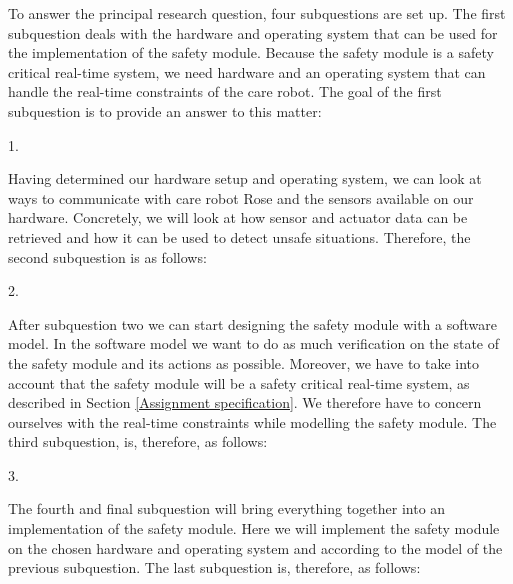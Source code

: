 \documentclass[12pt]{scrreprt}
\begin{document}
To answer the principal research question, four subquestions are set up. The first subquestion deals with the hardware and operating system that can be used for the implementation of the safety module. Because the safety module is a safety critical real-time system, we need hardware and an operating system that can handle the real-time constraints of the care robot. The goal of the first subquestion is to provide an answer to this matter:

\begin{flushleft}
1. \textit{\sqone}
\end{flushleft}

%

Having determined our hardware setup and operating system, we can look at ways to communicate with care robot Rose and the sensors available on our hardware. Concretely, we will look at how sensor and actuator data can be retrieved and how it can be used to detect unsafe situations. Therefore, the second subquestion is as follows:

\begin{flushleft}
2. \textit{\sqtwo}
\end{flushleft}

After subquestion two we can start designing the safety module with a software model. In the software model we want to do as much verification on the state of the safety module and its actions as possible. Moreover, we have to take into account that the safety module will be a safety critical real-time system, as described in Section \ref{Assignment specification}.
We therefore have to concern ourselves with the real-time constraints while modelling the safety module. The third subquestion, is, therefore, as follows:

\begin{flushleft}
3. \textit{\sqthree}
\end{flushleft}

The fourth and final subquestion will bring everything together into an implementation of the safety module. Here we will implement the safety module on the chosen hardware and operating system and according to the model of the previous subquestion. The last subquestion is, therefore, as follows:
\end{document}

